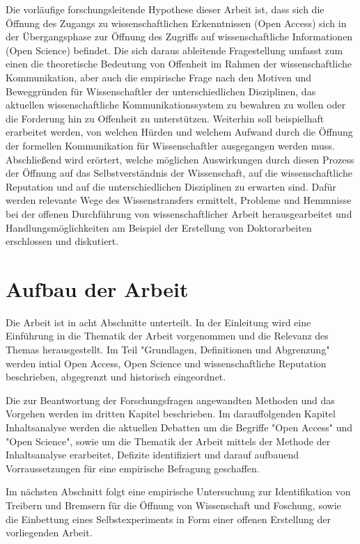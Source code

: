 Die vorläufige forschungsleitende Hypothese dieser Arbeit ist, dass sich die Öffnung des Zugangs zu wissenschaftlichen Erkenntnissen (Open Access) sich in der Übergangsphase zur Öffnung des Zugriffs auf wissenschaftliche Informationen (Open Science) befindet. Die sich daraus ableitende Fragestellung umfasst zum einen die theoretische Bedeutung von Offenheit im Rahmen der wissenschaftliche Kommunikation, aber auch die empirische Frage nach den Motiven und Beweggründen für Wissenschaftler der unterschiedlichen Disziplinen, das aktuellen wissenschaftliche Kommunikationssystem zu bewahren zu wollen oder die Forderung hin zu Offenheit zu unterstützen. Weiterhin soll beispielhaft erarbeitet werden, von welchen Hürden und welchem Aufwand durch die Öffnung der formellen Kommunikation für Wissenschaftler ausgegangen werden muss. Abschließend wird erörtert, welche möglichen Auswirkungen durch diesen Prozess der Öffnung auf das Selbstverständnis der Wissenschaft, auf die wissenschaftliche Reputation und auf die unterschiedlichen Disziplinen zu erwarten sind. Dafür werden relevante Wege des Wissenstransfers ermittelt, Probleme und Hemmnisse bei der offenen Durchführung von wissenschaftlicher Arbeit herausgearbeitet und Handlungsmöglichkeiten am Beispiel der Erstellung von Doktorarbeiten erschlossen und diskutiert.

\section{Aufbau der Arbeit}

Die Arbeit ist in acht Abschnitte unterteilt. In der Einleitung wird eine Einführung in die Thematik der Arbeit vorgenommen und die Relevanz des Themas herausgestellt. Im Teil "Grundlagen, Definitionen und Abgrenzung" werden intial Open Access, Open Science und wissenschaftliche Reputation beschrieben, abgegrenzt und historisch eingeordnet.

Die zur Beantwortung der Forschungsfragen angewandten Methoden und das Vorgehen werden im dritten Kapitel beschrieben. Im darauffolgenden Kapitel Inhaltsanalyse werden die aktuellen Debatten um die Begriffe "Open Access" und "Open Science", sowie um die Thematik der Arbeit mittels der Methode der Inhaltsanalyse erarbeitet, Defizite identifiziert und darauf aufbauend Vorraussetzungen für eine empirische Befragung geschaffen.

Im nächsten Abschnitt folgt eine empirische Untersuchung zur Identifikation von Treibern und Bremsern für die Öffnung von Wissenschaft und Foschung, sowie die Einbettung eines Selbstexperiments in Form einer offenen Erstellung der vorliegenden Arbeit.

